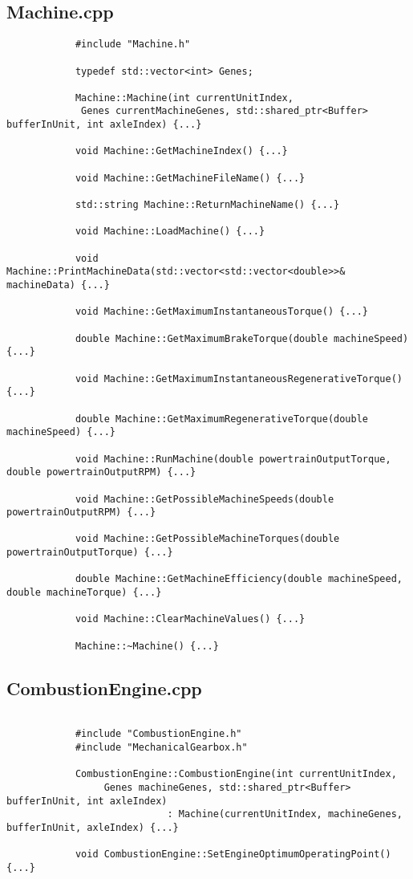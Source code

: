 \documentclass[ExampleMasters.tex]{subfiles}
\begin{document}
		\subsection{Machine.cpp} \label{sec:appendixmachine}
			\begin{verbatim}
			#include "Machine.h"

			typedef std::vector<int> Genes;

			Machine::Machine(int currentUnitIndex,
			 Genes currentMachineGenes, std::shared_ptr<Buffer> bufferInUnit, int axleIndex) {...}

			void Machine::GetMachineIndex() {...}

			void Machine::GetMachineFileName() {...}

			std::string Machine::ReturnMachineName() {...}

			void Machine::LoadMachine() {...}

			void Machine::PrintMachineData(std::vector<std::vector<double>>& machineData) {...}

			void Machine::GetMaximumInstantaneousTorque() {...}

			double Machine::GetMaximumBrakeTorque(double machineSpeed) {...}

			void Machine::GetMaximumInstantaneousRegenerativeTorque() {...}

			double Machine::GetMaximumRegenerativeTorque(double machineSpeed) {...}

			void Machine::RunMachine(double powertrainOutputTorque, double powertrainOutputRPM) {...}

			void Machine::GetPossibleMachineSpeeds(double powertrainOutputRPM) {...}

			void Machine::GetPossibleMachineTorques(double powertrainOutputTorque) {...}

			double Machine::GetMachineEfficiency(double machineSpeed, double machineTorque) {...}

			void Machine::ClearMachineValues() {...}

			Machine::~Machine() {...}
			\end{verbatim}

		\subsection{CombustionEngine.cpp}\label{sec:appendixcombustionengine}
			\begin{verbatim}

			#include "CombustionEngine.h"
			#include "MechanicalGearbox.h"

			CombustionEngine::CombustionEngine(int currentUnitIndex,
				 Genes machineGenes, std::shared_ptr<Buffer> bufferInUnit, int axleIndex) 
							: Machine(currentUnitIndex, machineGenes, bufferInUnit, axleIndex) {...}

			void CombustionEngine::SetEngineOptimumOperatingPoint() {...}
			\end{verbatim}
\end{document}
